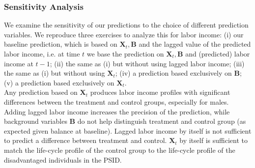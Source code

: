 \subsubsection{Sensitivity Analysis}

\noindent We examine the sensitivity of our predictions to the choice of different prediction variables. We reproduce three exercises to analyze this for labor income: (i) our baseline prediction, which is based on $\bm{X}_{t}, \bm{B}$ and the lagged value of the predicted labor income, i.e. at time $t$ we base the prediction on $\bm{X}_{t}, \bm{B}$ and (predicted) labor income at $t-1$; (ii) the same as (i) but without using lagged labor income; (iii) the same as (i) but without using $\bm{X}_{t}$; (iv) a prediction based exclusively on $\bm{B}$; (v) a prediction based exclusively on $\bm{X}_{t}$.\\

\noindent Any prediction based on $\bm{X}_{t}$ produces labor income profiles with significant differences between the treatment and control groups, especially for males. Adding lagged labor income increases the precision of the prediction, while background variables $\bm{B}$ do not help distinguish treatment and control group (as expected given balance at baseline). Lagged labor income by itself is not sufficient to predict a difference between treatment and control. $\bm{X}_{t}$ by itself is sufficient to match the life-cycle profile of the control group to the life-cycle profile of the disadvantaged individuals in the PSID.\\

